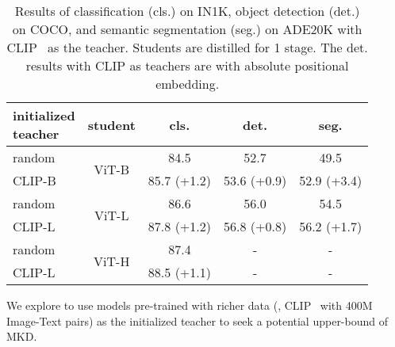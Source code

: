 \documentclass[10pt,twocolumn,letterpaper]{article}
\begin{document}
\begin{table}[t]
    \begin{center}
    \setlength{\tabcolsep}{0.7mm}
    \begin{tabular}{l|c|ccc}
        \makecell[l]{initialized\\ teacher} &student & cls.& det. & seg. \\
        \hline
        \textcolor{gray!80}{random} & \multirow{2}{*}{ViT-B} & \textcolor{gray!80}{84.5} \hspace{0.88cm} & \textcolor{gray!80}{52.7} \hspace{0.88cm} & \textcolor{gray!80}{49.5} \hspace{0.88cm} \\
        CLIP-B~\cite{clip} & & 85.7 \textcolor{mgreen}{(+1.2)} &
        53.6 \textcolor{mgreen}{(+0.9)} &
        52.9 \textcolor{mgreen}{(+3.4)}  \\
        \hline
        \textcolor{gray!80}{random} & \multirow{2}{*}{ViT-L} &\textcolor{gray!80}{86.6} \hspace{0.88cm} & 
        \textcolor{gray!80}{56.0}\hspace{0.88cm} &
        \textcolor{gray!80}{54.5} \hspace{0.88cm} \\
        CLIP-L~\cite{clip} & &
        87.8 \textcolor{mgreen}{(+1.2)} & 
        56.8 \textcolor{mgreen}{(+0.8)}&
        56.2 \textcolor{mgreen}{(+1.7)}\\
        \hline
        \textcolor{gray!80}{random} & \multirow{2}{*}{ViT-H} &\textcolor{gray!80}{87.4} \hspace{0.88cm} & \textcolor{gray!80}{-}&\textcolor{gray!80}{-} \\
        CLIP-L~\cite{clip}& &
        88.5 \textcolor{mgreen}{(+1.1)} &- & -\\
    \end{tabular}
    \end{center}
    \caption{Results of classification (cls.) on IN1K, object detection (det.) on COCO, and semantic segmentation (seg.) on ADE20K with CLIP~\cite{clip} as the teacher. Students are distilled for 1 stage. The det. results with CLIP as teachers are with absolute positional embedding.}
    \label{tab:clip-downstream}
\vspace{-0.4cm}
\end{table}


We explore to use models pre-trained with richer data (\ie, CLIP~\cite{clip} with 400M Image-Text pairs) as the initialized teacher to seek a potential upper-bound of MKD. 
\end{document}
